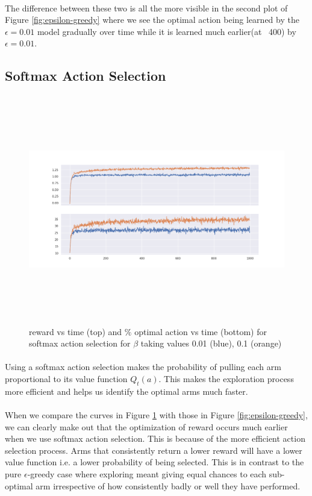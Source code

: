 \documentclass[12pt]{extarticle}
\begin{document}
\paragraph{} The difference between these two is all the more visible in the second plot of Figure \ref{fig:epsilon-greedy} where we see the optimal action being learned by the $\epsilon=0.01$ model gradually over time while it is learned much earlier(at ~400) by $\epsilon=0.01$.

\subsection{Softmax Action Selection}

\begin{figure}[H]
	\includegraphics[width=\textwidth, height=10cm]{softmax-action-selection.png}
	\caption{reward vs time (top) and $\%$ optimal action vs time (bottom) for softmax action selection for $\beta$ taking values 0.01 (blue), 0.1 (orange)}
	\label{fig:softmax-action-selection}
\end{figure}

\paragraph{} Using a softmax action selection makes the probability of pulling each arm proportional to its value function $Q_t(a)$. This makes the exploration process more efficient and helps us identify the optimal arms much faster.

\paragraph{} When we compare the curves in Figure \ref{fig:softmax-action-selection} with those in Figure \ref{fig:epsilon-greedy}, we can clearly make out that the optimization of reward occurs much earlier when we use softmax action selection. This is because of the more efficient action selection process. Arms that consistently return a lower reward will have a lower value function i.e. a lower probability of being selected. This is in contrast to the pure $\epsilon$-greedy case where exploring meant giving equal chances to each sub-optimal arm irrespective of how consistently badly or well they have performed.
\end{document}
